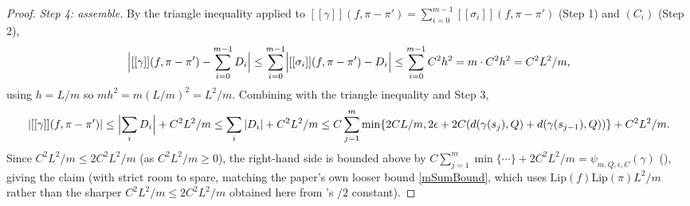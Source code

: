 \begin{proof}
  \emph{Step 4: assemble.} By the triangle inequality applied to
  $[[\gamma]](f,\pi-\pi') = \sum_{i=0}^{m-1}[[\sigma_i]](f,\pi-\pi')$ (Step 1) and $(C_i)$ (Step 2),
  \[
    \Bigl|[[\gamma]](f,\pi-\pi') - \sum_{i=0}^{m-1} D_i\Bigr|
      \le \sum_{i=0}^{m-1}\Bigl|[[\sigma_i]](f,\pi-\pi') - D_i\Bigr| \le \sum_{i=0}^{m-1} C^2h^2
      = m\cdot C^2 h^2 = C^2 L^2/m
    ,
  \]
  using $h=L/m$ so $m h^2 = m(L/m)^2 = L^2/m$. Combining with the triangle inequality and Step 3,
  \[
    |[[\gamma]](f,\pi-\pi')| \le \Bigl|\sum_i D_i\Bigr| + C^2L^2/m
      \le \sum_i |D_i| + C^2L^2/m
      \le C\sum_{j=1}^m \min\{2CL/m, 2\epsilon+2C(d(\gamma(s_j),Q)+d(\gamma(s_{j-1}),Q))\} + C^2L^2/m
    .
  \]
  Since $C^2L^2/m \le 2C^2L^2/m$ (as $C^2L^2/m \ge 0$), the right-hand side is bounded above by
  $C\sum_{j=1}^m\min\{\cdots\} + 2C^2L^2/m = \psi_{m,Q,\epsilon,C}(\gamma)$ (), giving
  the claim (with strict room to spare, matching the paper's own looser bound
  \eqref{mSumBound}, which uses $\mathrm{Lip}(f)\mathrm{Lip}(\pi)L^2/m$ rather than the sharper
  $C^2L^2/m \le 2C^2L^2/m$ obtained here from 's $/2$ constant).
\end{proof}
